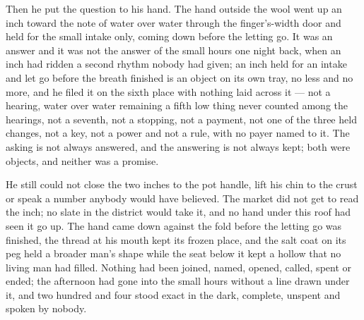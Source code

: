 Then he put the question to his hand. The hand outside the wool went up an inch toward the note of water over water through the finger's-width door and held for the small intake only, coming down before the letting go. It was an answer and it was not the answer of the small hours one night back, when an inch had ridden a second rhythm nobody had given; an inch held for an intake and let go before the breath finished is an object on its own tray, no less and no more, and he filed it on the sixth place with nothing laid across it --- not a hearing, water over water remaining a fifth low thing never counted among the hearings, not a seventh, not a stopping, not a payment, not one of the three held changes, not a key, not a power and not a rule, with no payer named to it. The asking is not always answered, and the answering is not always kept; both were objects, and neither was a promise.

He still could not close the two inches to the pot handle, lift his chin to the crust or speak a number anybody would have believed. The market did not get to read the inch; no slate in the district would take it, and no hand under this roof had seen it go up. The hand came down against the fold before the letting go was finished, the thread at his mouth kept its frozen place, and the salt coat on its peg held a broader man's shape while the seat below it kept a hollow that no living man had filled. Nothing had been joined, named, opened, called, spent or ended; the afternoon had gone into the small hours without a line drawn under it, and two hundred and four stood exact in the dark, complete, unspent and spoken by nobody.

